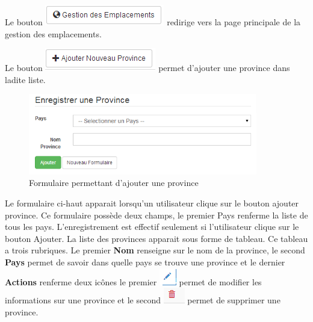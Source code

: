 \documentclass[12pt,a4paper]{report}
\begin{document}
Le bouton \includegraphics[scale=0.7]{pic/GestionEmplacement.png} redirige vers la page principale de la gestion des emplacements.

Le bouton \includegraphics[scale=0.7]{pic/AddNewProvince.png} permet d'ajouter une province dans ladite liste.
\begin{figure}[h]
\begin{center}
\includegraphics[width=10cm]{pic/FormNewProvince.png}
\end{center}
\caption{Formulaire permettant d'ajouter une province}
\label{Formulaire permettant d'ajouter une province}
\end{figure}


Le formulaire ci-haut apparait lorsqu'un utilisateur clique sur le bouton ajouter province. Ce formulaire possède deux champs, le premier Pays renferme la liste de tous les pays. 
L'enregistrement est effectif seulement si l'utilisateur clique sur le bouton Ajouter. La liste des provinces apparait sous forme de tableau. Ce tableau a trois rubriques. Le premier \textbf{Nom} renseigne sur le nom de la province, le second \textbf{Pays} permet de savoir dans quelle pays se trouve une province et le dernier \textbf{Actions} renferme deux icônes le premier 
\includegraphics[scale=0.7]{pic/EditUser.png}  permet de modifier les informations sur une province et le second  \includegraphics[scale=0.7]{pic/DeleteWRed.png}  permet de supprimer une province.
\end{document}
